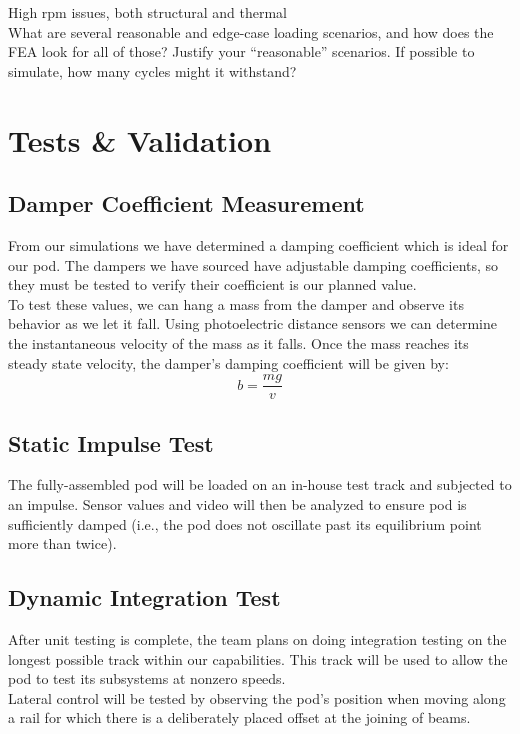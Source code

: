 \documentclass[main.tex]{subfiles}
\begin{document}
    High rpm issues, both structural and thermal\\
    What are several reasonable and edge-case loading scenarios, and how does the FEA look for all of those? Justify your “reasonable” scenarios. If possible to simulate, how many cycles might it withstand?

    \section{Tests \& Validation }
    \subsection{Damper Coefficient Measurement}
    From our simulations we have determined a damping coefficient which is ideal for our pod. The dampers we have sourced have adjustable damping coefficients, so they must be tested to verify their coefficient is our planned value.\\
    To test these values, we can hang a mass from the damper and observe its behavior as we let it fall. Using photoelectric distance sensors we can determine the instantaneous velocity of the mass as it falls. Once the mass reaches its steady state velocity, the damper's damping coefficient will be given by:
    \begin{equation}\label{eq:damper}
     b = \frac{mg}{v}
    \end{equation}
    \subsection{Static Impulse Test}
    The fully-assembled pod will be loaded on an in-house test track and subjected to an impulse. Sensor values and video will then be analyzed to ensure pod is sufficiently damped (i.e., the pod does not oscillate past its equilibrium point more than twice).
    \subsection{Dynamic Integration Test}
    After unit testing is complete, the team plans on doing integration testing on the longest possible track within our capabilities. This track will be used to allow the pod to test its subsystems at nonzero speeds.\\
    Lateral control will be tested by observing the pod's position when moving along a rail for which there is a deliberately placed offset at the joining of beams.
\end{document}
